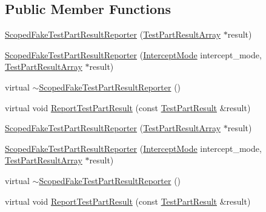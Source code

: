 \subsection*{Public Member Functions}
\begin{DoxyCompactItemize}
\item 
\hyperlink{classtesting_1_1_scoped_fake_test_part_result_reporter_aa0100ecf4799fb51d45167be6a5de1d5}{Scoped\-Fake\-Test\-Part\-Result\-Reporter} (\hyperlink{classtesting_1_1_test_part_result_array}{Test\-Part\-Result\-Array} $\ast$result)
\item 
\hyperlink{classtesting_1_1_scoped_fake_test_part_result_reporter_a57cbc09ed48627c8a73e622618dc4b4f}{Scoped\-Fake\-Test\-Part\-Result\-Reporter} (\hyperlink{classtesting_1_1_scoped_fake_test_part_result_reporter_a82f6209b3cf5c4b15ec8bd8041dbc2d5}{Intercept\-Mode} intercept\-\_\-mode, \hyperlink{classtesting_1_1_test_part_result_array}{Test\-Part\-Result\-Array} $\ast$result)
\item 
virtual \hyperlink{classtesting_1_1_scoped_fake_test_part_result_reporter_a4817d59ca70228ebd5d5c3c4e8dd729d}{$\sim$\-Scoped\-Fake\-Test\-Part\-Result\-Reporter} ()
\item 
virtual void \hyperlink{classtesting_1_1_scoped_fake_test_part_result_reporter_a82531434f51632d98ed7cdcdb10b8b92}{Report\-Test\-Part\-Result} (const \hyperlink{classtesting_1_1_test_part_result}{Test\-Part\-Result} \&result)
\item 
\hyperlink{classtesting_1_1_scoped_fake_test_part_result_reporter_aa0100ecf4799fb51d45167be6a5de1d5}{Scoped\-Fake\-Test\-Part\-Result\-Reporter} (\hyperlink{classtesting_1_1_test_part_result_array}{Test\-Part\-Result\-Array} $\ast$result)
\item 
\hyperlink{classtesting_1_1_scoped_fake_test_part_result_reporter_a57cbc09ed48627c8a73e622618dc4b4f}{Scoped\-Fake\-Test\-Part\-Result\-Reporter} (\hyperlink{classtesting_1_1_scoped_fake_test_part_result_reporter_a82f6209b3cf5c4b15ec8bd8041dbc2d5}{Intercept\-Mode} intercept\-\_\-mode, \hyperlink{classtesting_1_1_test_part_result_array}{Test\-Part\-Result\-Array} $\ast$result)
\item 
virtual \hyperlink{classtesting_1_1_scoped_fake_test_part_result_reporter_a916585996236c45e447546a3bcc0796c}{$\sim$\-Scoped\-Fake\-Test\-Part\-Result\-Reporter} ()
\item 
virtual void \hyperlink{classtesting_1_1_scoped_fake_test_part_result_reporter_a3bc6cb939cbc3db71ece8846e6bafe00}{Report\-Test\-Part\-Result} (const \hyperlink{classtesting_1_1_test_part_result}{Test\-Part\-Result} \&result)
\end{DoxyCompactItemize}


